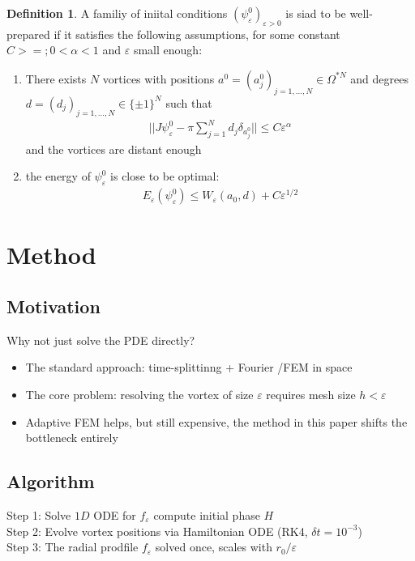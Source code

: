 \documentclass[12pt, a4paper]{article}
\theoremstyle{plain}
\theoremstyle{definition}
\newtheorem{definition}[theorem]{Definition}
\newcommand{\psieps}{\psi_\varepsilon}
\begin{document}
\begin{definition}
  A familiy of iniital conditions $(\psieps^0)_{\varepsilon>0}$ is siad to be well-prepared if it satisfies the following assumptions,
  for some constant $C>=; 0<\alpha<1$ and $\varepsilon$ small enough:
  \begin{enumerate}
    \item There exists $N$ vortices with positions
    $a^0 = (a^0_j)_{j=1, \ldots , N} \in \Omega^{*N}$
    and degrees $d= (d_j)_{j=1, \ldots, N} \in \{\pm 1\}^N$
    such that
    \begin{align}
      ||J\psieps^0 - \pi \sum^N_{j=1} d_j \delta_{a_j^0}|| \leq C \varepsilon^\alpha 
    \end{align}
    and the vortices are distant enough
    \item the energy of $\psieps^0$ is close to be optimal:
    \begin{align}
      E_\varepsilon (\psieps^0) \leq W_\varepsilon (a_0, d) + C \varepsilon^{1/2}
    \end{align}
  \end{enumerate}
\end{definition}


\section{Method}
\subsection{Motivation}
Why not just solve the PDE directly?
\begin{itemize}
  \item The standard approach: time-splittinng + Fourier /FEM in space
  \item The core problem: resolving the vortex of size $\varepsilon$ requires mesh size $h<\varepsilon$
  \item Adaptive FEM helps, but still expensive, the method in this paper shifts the bottleneck entirely
\end{itemize}


\subsection{Algorithm}

Step 1: Solve $1D$ ODE for $f_\varepsilon$ compute initial phase $H$ \\
Step 2: Evolve vortex positions via Hamiltonian ODE (RK4, $\delta t = 10^{-3}$) \\
Step 3: The radial prodfile $f_\varepsilon$ solved once, scales with $r_0/\varepsilon$ \\
\end{document}

